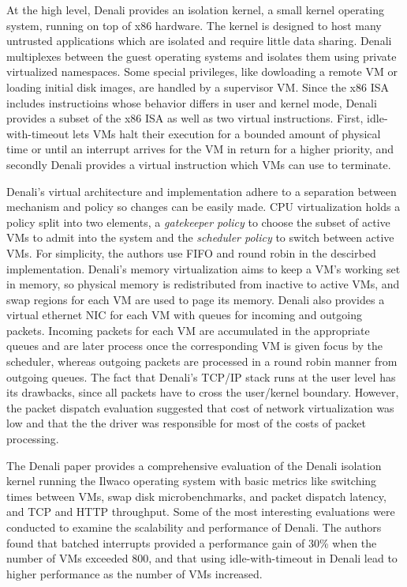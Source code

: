 \documentclass[letterpaper, twocolumn]{article}
\begin{document}
At the high level, Denali provides an isolation kernel, a small kernel operating system, running
on top of x86 hardware. The kernel is designed to host many untrusted applications which are isolated
and require little data sharing. Denali multiplexes between the guest operating systems and isolates them
using private virtualized namespaces. Some special privileges, 
like dowloading a remote VM or loading initial disk images, are handled by a supervisor VM.
Since the x86 ISA includes instructioins whose behavior differs
in user and kernel mode, Denali provides a subset of the x86 ISA as well as two virtual instructions.
First, idle-with-timeout lets VMs halt their execution for a bounded amount of physical time or until
an interrupt arrives for the VM in return for a higher priority, 
and secondly Denali provides a virtual instruction which VMs can use to terminate.

Denali's virtual architecture and implementation adhere to a separation between mechanism and policy 
so changes can be easily made. CPU virtualization holds a policy split into two elements, 
a \emph{gatekeeper policy} to choose the subset of active VMs to admit into the system and 
the \emph{scheduler policy} to switch between active VMs. For simplicity, the authors use FIFO
and round robin in the descirbed implementation. 
Denali's memory virtualization aims to keep a VM's working set in memory, so physical memory 
is redistributed from inactive to active VMs, and swap regions for each VM are used to page its memory.
Denali also provides a virtual ethernet NIC for each VM with queues for incoming and outgoing packets.
Incoming packets for each VM are accumulated in the appropriate queues and are later process once the
corresponding VM is given focus by the scheduler, whereas outgoing packets are processed in a round robin manner
from outgoing queues. The fact that Denali's TCP/IP stack runs at the user level has its drawbacks, 
since all packets have to cross the user/kernel boundary. However, the packet dispatch evaluation 
suggested that cost of network virtualization was low and that the the driver was responsible for most of the
costs of packet processing.

The Denali paper provides a comprehensive evaluation of the Denali isolation kernel running
the Ilwaco operating system with basic metrics like switching times between VMs, swap disk
microbenchmarks, and packet dispatch latency, and TCP and HTTP throughput. Some of the most
interesting evaluations were conducted to examine the scalability and performance of Denali.
The authors found that batched interrupts provided a performance gain of 30\% when the number
of VMs exceeded 800, and that using idle-with-timeout in Denali lead to higher performance as
the number of VMs increased.
\end{document}
